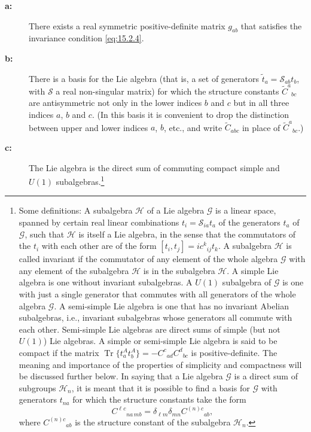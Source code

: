 \begin{description}
 \item[\textbf{a:}] There exists a real symmetric positive-definite matrix
 $g_{ab}$ that satisfies the invariance condition
 \eqref{eq:15.2.4}.

 \item[\textbf{b:}] There is a basis for the Lie algebra (that is, a set of
 generators $\widetilde t_a=\mathcal S_{ab}t_b$, with
 $\mathcal S$ a real non-singular matrix) for which the structure constants
 $\widetilde C^a{}_{bc}$ are antisymmetric not only in the lower
 indices $b$ and $c$ but in all three indices $a$, $b$ and
 $c$. (In this basis it is convenient to drop the distinction between
 upper and lower indices $a$, $b$, etc., and write
 $\widetilde C_{abc}$ in place of
 $\widetilde C^a{}_{bc}$.)

 \item[\textbf{c:}] The Lie algebra is the direct sum of commuting compact
 simple and $U(1)$ subalgebras.\footnote{Some definitions: A subalgebra
 $\mathcal H$ of a Lie algebra $\mathcal G$ is a linear space, spanned by certain
 real linear combinations $t_i=\mathcal S_{ia}t_a$ of the generators
 $t_a$ of $\mathcal G$, such that $\mathcal H$ is itself a Lie algebra, in
 the sense that the commutators of the $t_i$ with each other are of the form
 $[t_i,t_j]=ic^k{}_{ij}t_k$. A subalgebra $\mathcal H$ is called invariant if
 the commutator of any element of the whole algebra $\mathcal G$ with any
 element of the subalgebra $\mathcal H$ is in the subalgebra $\mathcal H$. A
 simple Lie algebra is one without invariant subalgebras. A $U(1)$ subalgebra
 of $\mathcal G$ is one with just a single generator that commutes with all
 generators of the whole algebra $\mathcal G$. A semi-simple Lie algebra is one
 that has no invariant Abelian subalgebras, i.e., invariant subalgebras whose
 generators all commute with each other. Semi-simple Lie algebras are direct
 sums of simple (but not $U(1)$) Lie algebras. A simple or semi-simple Lie
 algebra is said to be compact if the matrix
 $\operatorname{Tr}\{t^A_a t^A_b\}
 =-C^c{}_{ad}C^d{}_{bc}$ is positive-definite.
 The meaning and importance of the properties of simplicity and compactness
 will be discussed further below. In saying that a Lie algebra $\mathcal G$ is
 a direct sum of subgroups $\mathcal H_n$, it is meant that it is possible to
 find a basis for $\mathcal G$ with generators $t_{na}$ for which the structure
 constants take the form
 \[
 C^{\ell c}{}_{na\,mb}=\delta_{\ell m}\delta_{mn}C^{(n)c}{}_{ab} ,
 \]
 where $C^{(n)c}{}_{ab}$ is the structure constant of the subalgebra
 $\mathcal H_n$.}
\end{description}

